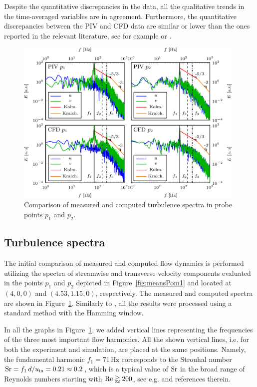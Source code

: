 Despite the quantitative discrepancies in the data, all the qualitative trends in the time-averaged variables are in agreement. Furthermore, the quantitative discrepancies between the PIV and CFD data are similar or lower than the ones reported {in the relevant literature, see }for example \citep{wen2016,gonzalez2019} or \citep{mustafa2021}.

\begin{figure}[htbp]
    \centering
    \includegraphics[width=0.98\textwidth]{02_images/00_export/figure7.png}
    \caption{Comparison of measured and computed turbulence spectra in probe points $p_{1}$ and $p_{2}$.}
    \label{fig:turbSpectraPts}
\end{figure}

\subsection{Turbulence spectra}
\label{sub:turbSpectra}

The initial comparison of measured and computed flow dynamics is performed utilizing the spectra of streamwise and {transverse} velocity components evaluated in the points $p_{1}$ and $p_{2}$ depicted in Figure~\ref{fig:meansPom1} and located at $(4,0,0)$ and $(4.53,1.15,0)$, respectively. The measured and computed spectra are shown in Figure~\ref{fig:turbSpectraPts}. Similarly to \citep{uruba2020a}, all the results were processed using {a} standard method with the Hamming window.

In all the graphs in Figure~\ref{fig:turbSpectraPts}, we added vertical lines representing the frequencies of the three most important {flow} harmonics. All the shown vertical lines, i.e. for both the experiment and simulation, are placed at the same positions. Namely, the fundamental harmonic $f_{1} = 71\,\mathrm{Hz}$ corresponds to the Strouhal number $\mathrm{Sr} = f_{1}\,d/u_{\mathrm{in}} = 0.21\approx 0.2$, which is a typical value of $\mathrm{Sr}$ in the broad range of Reynolds numbers starting with $\mathrm{Re} \gtrapprox 200$, see e.g. \citep{lienhard1966} and references therein.

